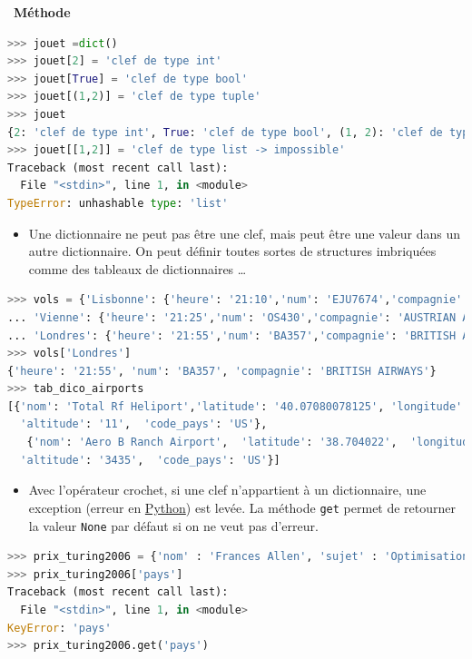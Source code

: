 \documentclass[
  11pt,
]{article}
\newcommand{\passthrough}[1]{#1}
\providecommand{\tightlist}{%
  \setlength{\itemsep}{0pt}\setlength{\parskip}{0pt}}
\newenvironment{methode}[1]
{\par \medskip    \noindent  
 \begin {bclogo}[arrondi =0.1,logo=\bcoutil, marge=4,noborder = true] {~\textbf{Méthode}   {\itshape #1} }  \par}
{
\end{bclogo}
 \par \bigskip }
\begin{document}
\begin{methode}{}
\begin{lstlisting}[language=Python]
>>> jouet =dict()
>>> jouet[2] = 'clef de type int'
>>> jouet[True] = 'clef de type bool'
>>> jouet[(1,2)] = 'clef de type tuple'
>>> jouet
{2: 'clef de type int', True: 'clef de type bool', (1, 2): 'clef de type tuple'}
>>> jouet[[1,2]] = 'clef de type list -> impossible'
Traceback (most recent call last):
  File "<stdin>", line 1, in <module>
TypeError: unhashable type: 'list'
\end{lstlisting}

\begin{itemize}
\tightlist
\item
  Une dictionnaire ne peut pas être une clef, mais peut être une valeur
  dans un autre dictionnaire. On peut définir toutes sortes de
  structures imbriquées comme des tableaux de dictionnaires \ldots{}
\end{itemize}

\begin{lstlisting}[language=Python]
>>> vols = {'Lisbonne': {'heure': '21:10','num': 'EJU7674','compagnie': 'EASYJET'},
... 'Vienne': {'heure': '21:25','num': 'OS430','compagnie': 'AUSTRIAN AIRLINES'},
... 'Londres': {'heure': '21:55','num': 'BA357','compagnie': 'BRITISH AIRWAYS'}}
>>> vols['Londres']
{'heure': '21:55', 'num': 'BA357', 'compagnie': 'BRITISH AIRWAYS'}
>>> tab_dico_airports
[{'nom': 'Total Rf Heliport','latitude': '40.07080078125', 'longitude': '-74.93360137939453',
  'altitude': '11',  'code_pays': 'US'},
   {'nom': 'Aero B Ranch Airport',  'latitude': '38.704022',  'longitude': '-101.473911',
  'altitude': '3435',  'code_pays': 'US'}]
\end{lstlisting}

\begin{itemize}
\tightlist
\item
  Avec l'opérateur crochet, si une clef n'appartient à un dictionnaire,
  une exception (erreur en
  \href{https://docs.python.org/3/tutorial/datastructures.html}{Python})
  est levée. La méthode \passthrough{\lstinline!get!} permet de
  retourner la valeur \passthrough{\lstinline!None!} par défaut si on ne
  veut pas d'erreur.
\end{itemize}

\begin{lstlisting}[language=Python]
>>> prix_turing2006 = {'nom' : 'Frances Allen', 'sujet' : 'Optimisation des compilateurs'}
>>> prix_turing2006['pays']
Traceback (most recent call last):
  File "<stdin>", line 1, in <module>
KeyError: 'pays'
>>> prix_turing2006.get('pays')
\end{lstlisting}

\end{methode}
\end{document}
